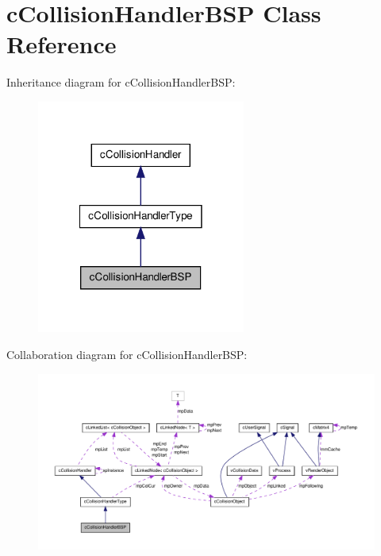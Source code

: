 \hypertarget{classc_collision_handler_b_s_p}{
\section{cCollisionHandlerBSP Class Reference}
\label{classc_collision_handler_b_s_p}
}


Inheritance diagram for cCollisionHandlerBSP:
\nopagebreak
\begin{figure}[H]
\begin{center}
\leavevmode
\includegraphics[width=194pt]{classc_collision_handler_b_s_p__inherit__graph}
\end{center}
\end{figure}


Collaboration diagram for cCollisionHandlerBSP:
\nopagebreak
\begin{figure}[H]
\begin{center}
\leavevmode
\includegraphics[width=400pt]{classc_collision_handler_b_s_p__coll__graph}
\end{center}
\end{figure}
